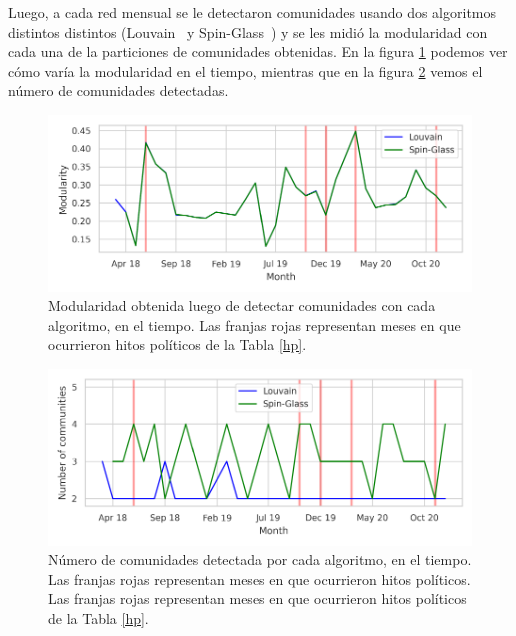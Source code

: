 \documentclass[hyperref]{proyectotesis}
\begin{document}
Luego, a cada red mensual se le detectaron comunidades usando dos algoritmos distintos distintos (Louvain~\cite{blondel_fast_2008} y Spin-Glass~\cite{reichardt_statistical_2006}) y se les midió la modularidad con cada una de la particiones de comunidades obtenidas. En la figura \ref{modfig} podemos ver cómo varía la modularidad en el tiempo, mientras que en la figura \ref{N} vemos el número de comunidades detectadas.\\
\begin{figure}[h!]
    \centering
    \includegraphics[width=0.85\linewidth]{mod.pdf} 
    \vspace{-5mm}
    \caption{Modularidad obtenida luego de detectar comunidades con cada algoritmo, en el tiempo. Las franjas rojas representan meses en que ocurrieron hitos políticos de la Tabla \ref{hp}.}
    \label{modfig}
\end{figure}
\begin{figure}[h!]
    \centering
    \includegraphics[width=0.85\linewidth]{N.pdf} 
    \vspace{-5mm}
    \caption{Número de comunidades detectada por cada algoritmo, en el tiempo. Las franjas rojas representan meses en que ocurrieron hitos políticos. Las franjas rojas representan meses en que ocurrieron hitos políticos de la Tabla \ref{hp}.}
    \label{N}
\end{figure}

\renewcommand{\tablename}{Tabla}
\end{document}
